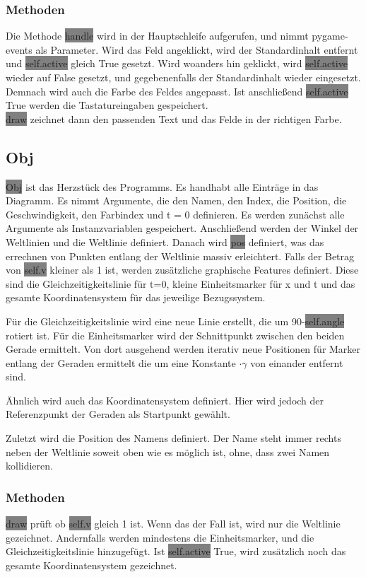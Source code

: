 \documentclass[12pt]{article}
\begin{document}
\subsubsection{Methoden}
Die Methode \colorbox{gray}{handle} wird in der Hauptschleife aufgerufen, und nimmt pygame-events als Parameter.
Wird das Feld angeklickt, wird der Standardinhalt entfernt und \colorbox{gray}{self.active} gleich True gesetzt.
Wird woanders hin geklickt, wird \colorbox{gray}{self.active} wieder auf False gesetzt, und gegebenenfalls der Standardinhalt wieder eingesetzt.
Demnach wird auch die Farbe des Feldes angepasst.
Ist anschließend \colorbox{gray}{self.active} True werden die Tastatureingaben gespeichert.
\\

\colorbox{gray}{draw} zeichnet dann den passenden Text und das Felde in der richtigen Farbe.
\subsection{Obj}
\colorbox{gray}{Obj} ist das Herzstück des Programms.
Es handhabt alle Einträge in das Diagramm.
Es nimmt Argumente, die den Namen, den Index, die Position, die Geschwindigkeit, den Farbindex und t = 0 definieren.
Es werden zunächst alle Argumente als Instanzvariablen gespeichert.
Anschließend werden der Winkel der Weltlinien und die Weltlinie definiert.
Danach wird \colorbox{gray}{pos} definiert, was das errechnen von Punkten entlang der Weltlinie massiv erleichtert.
Falls der Betrag von \colorbox{gray}{self.v} kleiner als 1 ist, werden zusätzliche graphische Features definiert.
Diese sind die Gleichzeitigkeitslinie für t=0, kleine Einheitsmarker für x und t und das gesamte Koordinatensystem für das jeweilige Bezugssystem.

Für die Gleichzeitigkeitslinie wird eine neue Linie erstellt, die um 90-\colorbox{gray}{self.angle} rotiert ist.
Für die Einheitsmarker wird der Schnittpunkt zwischen den beiden Gerade ermittelt.
Von dort ausgehend werden iterativ neue Positionen für Marker entlang der Geraden ermittelt die um eine Konstante $\cdot \gamma$ von einander entfernt sind.

Ähnlich wird auch das Koordinatensystem definiert.
Hier wird jedoch der Referenzpunkt der Geraden als Startpunkt gewählt.

Zuletzt wird die Position des Namens definiert.
Der Name steht immer rechts neben der Weltlinie soweit oben wie es möglich ist, ohne, dass zwei Namen kollidieren.
\subsubsection{Methoden}
\colorbox{gray}{draw} prüft ob \colorbox{gray}{self.v} gleich 1 ist.
Wenn das der Fall ist, wird nur die Weltlinie gezeichnet.
Andernfalls werden mindestens die Einheitsmarker, und die Gleichzeitigkeitslinie hinzugefügt.
Ist \colorbox{gray}{self.active} True, wird zusätzlich noch das gesamte Koordinatensystem gezeichnet.
\\
\end{document}
